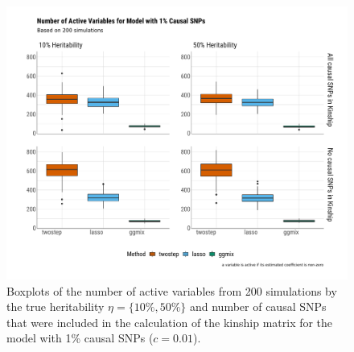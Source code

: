 \documentclass[12pt,letter]{article}\usepackage[]{graphicx}\usepackage[]{color}
\newenvironment{knitrout}{}{} %
\begin{document}
\begin{knitrout}\scriptsize
{}\color{fgcolor}\begin{figure}[H]

{\centering \includegraphics[width=1\linewidth]{figure/plot-nactive-sim-1p-causal-1} 

}

\caption[Boxplots of the number of active variables from 200 simulations by the true heritability $\eta = \lbrace 10\%, 50\% \rbrace$ and number of causal SNPs that were included in the calculation of the kinship matrix for the model with 1\% causal SNPs ($c=0.01$)]{Boxplots of the number of active variables from 200 simulations by the true heritability $\eta = \lbrace 10\%, 50\% \rbrace$ and number of causal SNPs that were included in the calculation of the kinship matrix for the model with 1\% causal SNPs ($c=0.01$).}\label{fig:plot-nactive-sim-1p-causal}
\end{figure}


\end{knitrout}
\end{document}

